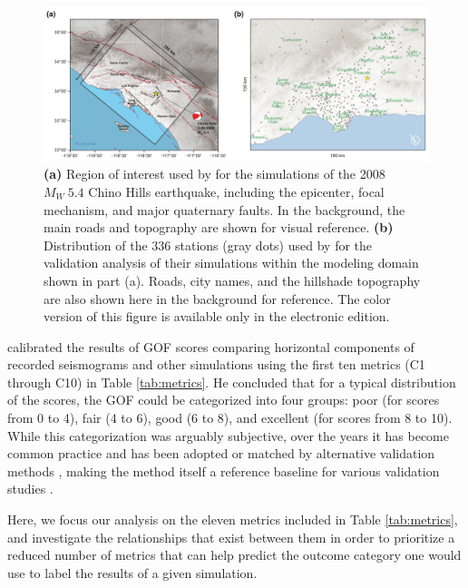 \begin{figure}
    \centering
    \includegraphics[width=\textwidth]{figures/pdf/figure-01}
    \caption{\textbf{(a)} Region of interest used by \citet{Taborda_2014_BSSA} for the simulations of the 2008 $M_W ~ 5.4$ Chino Hills earthquake, including the epicenter, focal mechanism, and major quaternary faults. In the background, the main roads and topography are shown for visual reference. \textbf{(b)} Distribution of the 336 stations (gray dots) used by \citet{Taborda_2014_BSSA} for the validation analysis of their simulations within the modeling domain shown in part (a). Roads, city names, and the hillshade topography are also shown here in the background for reference. The color version of this figure is available only in the electronic edition.}
    \label{fig:chino-hills}
\end{figure}

\citet{Anderson_2004_Proc} calibrated the results of GOF scores comparing horizontal components of recorded seismograms and other simulations using the first ten metrics (C1 through C10) in Table \ref{tab:metrics}. He concluded that for a typical distribution of the scores, the GOF could be categorized into four groups: poor (for scores from 0 to 4), fair (4 to 6), good (6 to 8), and excellent (for scores from 8 to 10). While this categorization was arguably subjective, over the years it has become common practice and has been adopted or matched by alternative validation methods \citep[e.g.,][]{Kristekova_2009_GJI, Olsen_2010_SRL}, making the method itself a reference baseline for various validation studies \citep[e.g.,][]{Chaljub_2010_BSSA, Bielak_2010_GJI, Guidotti_2011_SRL, Maufroy_2015_BSSA}.

Here, we focus our analysis on the eleven metrics included in Table \ref{tab:metrics}, and investigate the relationships that exist between them in order to prioritize a reduced number of metrics that can help predict the outcome category one would use to label the results of a given simulation.

